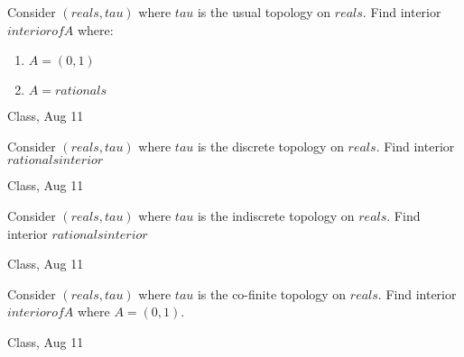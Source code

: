 \begin{samepage}
\begin{ex}
Consider $(reals, tau)$ where $tau$ is the usual topology on $reals$.
Find interior $interior of A$ where:
    \begin{enumerate}
        \item $A = (0,1)$
        \item $A = rationals$
    \end{enumerate}
\end{ex}
\begin{source}
Class, Aug 11
\end{source}
\end{samepage}

\begin{samepage}
\begin{ex}
Consider $(reals, tau)$ where $tau$ is the discrete topology on $reals$.
Find interior $rationals interior$
\end{ex}
\begin{source}
Class, Aug 11
\end{source}
\end{samepage}

\begin{samepage}
\begin{ex}
Consider $(reals, tau)$ where $tau$ is the indiscrete topology on $reals$.
Find interior $rationals interior$
\end{ex}
\begin{source}
Class, Aug 11
\end{source}
\end{samepage}

\begin{samepage}
\begin{ex}
Consider $(reals, tau)$ where $tau$ is the co-finite topology on $reals$.
Find interior $interior of A$ where $A = (0,1)$.
\end{ex}
\begin{source}
Class, Aug 11
\end{source}
\end{samepage}
